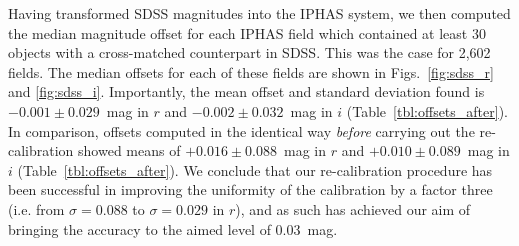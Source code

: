 \documentclass[a4paper,useAMS,usenatbib]{mn2e}
\begin{document}
Having transformed SDSS magnitudes into the IPHAS system,
we then computed the median magnitude offset for each IPHAS field
which contained at least 30 objects with a cross-matched counterpart
in SDSS.  This was the case for 2,602 fields.
The median offsets for each of these fields
are shown in Figs.~\ref{fig:sdss_r} and \ref{fig:sdss_i}.
Importantly, the mean offset and standard deviation found 
is $-0.001\pm0.029$~mag in $r$
and $-0.002\pm0.032$~mag in $i$ (Table~\ref{tbl:offsets_after}).
In comparison, offsets computed in the identical way
\emph{before} carrying out the re-calibration showed means
of $+0.016\pm0.088$~mag in $r$ and $+0.010\pm0.089$~mag in $i$ (Table~\ref{tbl:offsets_after}).
We conclude that our re-calibration procedure has
been successful in improving the
uniformity of the calibration
by a factor three (i.e. from $\sigma=0.088$ to $\sigma=0.029$ in $r$),
and as such has achieved our aim of bringing the
accuracy to the aimed level of 0.03~mag.
\end{document}
